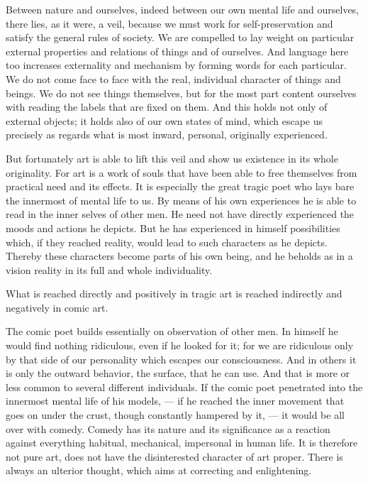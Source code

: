 \documentclass[12pt,a4paper,openany]{book}
\newcommand{\opage}[1]{\marginnote{\footnotesize\textit{[#1]}}}
\begin{document}
Between nature and ourselves, indeed between our own mental life and ourselves, there lies, as it were, a veil, because we must work for self-preservation and satisfy the general rules of society. We are compelled to lay weight on particular external properties and relations of things and of ourselves. And language here too increases externality and mechanism by forming words for each particular. We do not come face to face with the real, individual character of things and beings. We do not see things themselves, but for the most part content ourselves with reading the labels that are fixed on them. And this holds not only of external objects; it holds also of our own states of mind, which escape us precisely as regards what is most inward, personal, originally experienced.

But fortunately art is able to lift this veil and show us existence in its whole originality. For art is a work of souls that have been able to free themselves from practical need and its effects. It is especially the great tragic poet who lays bare the innermost of mental life to us. By means of his own experiences he is able to read in the inner selves of other men. He need not have directly experienced the moods and actions he depicts. But he has experienced in himself possibilities which, if they reached reality, would lead to such characters as he depicts. Thereby these characters become parts of his own being, and he beholds as in a vision reality in its full and whole individuality.

What is reached directly and positively in tragic art is reached indirectly and negatively in comic art.

The comic poet builds essentially on observation of other men. In himself he would find nothing ridiculous, even if he looked for it; for we are ridiculous only by that side of our personality which escapes our consciousness. And in others it is only the outward behavior, the surface, that he can use. And that is more or less common to several
\opage{48}different individuals. If the comic poet penetrated into the innermost mental life of his models, --- if he reached the inner movement that goes on under the crust, though constantly hampered by it, --- it would be all over with comedy. Comedy has its nature and its significance as a reaction against everything habitual, mechanical, impersonal in human life. It is therefore not pure art, does not have the disinterested character of art proper. There is always an ulterior thought, which aims at correcting and enlightening.
\end{document}
